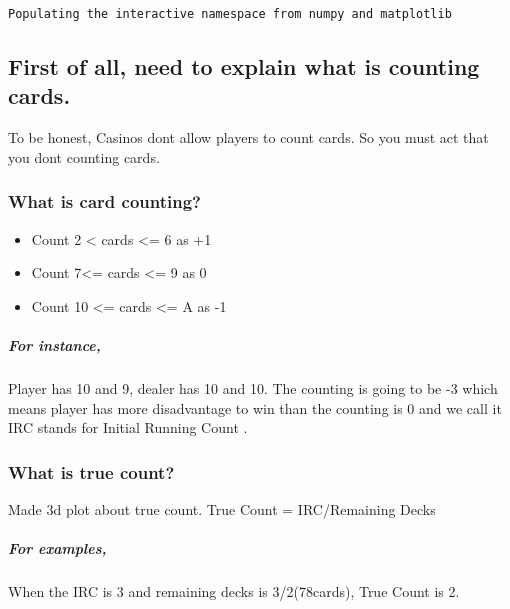 \documentclass[11pt]{article}
\providecommand{\tightlist}{%
      \setlength{\itemsep}{0pt}\setlength{\parskip}{0pt}}
\begin{document}
    \begin{Verbatim}[commandchars=\\\{\}]
Populating the interactive namespace from numpy and matplotlib

    \end{Verbatim}

    \subsection{First of all, need to explain what is counting
cards.}\label{first-of-all-need-to-explain-what-is-counting-cards.}

To be honest, Casinos dont allow players to count cards. So you must act
that you dont counting cards.

\subsubsection{\texorpdfstring{What is card
counting?}{What is card counting? }}\label{what-is-card-counting}

\begin{itemize}
\tightlist
\item
  Count 2 \textless{} cards \textless{}= 6 as +1
\item
  Count 7\textless{}= cards \textless{}= 9 as 0
\item
  Count 10 \textless{}= cards \textless{}= A as -1
\end{itemize}

\subparagraph{For instance,}\label{for-instance}

Player has 10 and 9, dealer has 10 and 10. The counting is going to be
-3 which means player has more disadvantage to win than the counting is
0 and we call it IRC stands for Initial Running Count .

\subsubsection{What is true count?}\label{what-is-true-count}

Made 3d plot about true count. True Count = IRC/Remaining Decks

\subparagraph{For examples,}\label{for-examples}

When the IRC is 3 and remaining decks is 3/2(78cards), True Count is 2.
\end{document}
